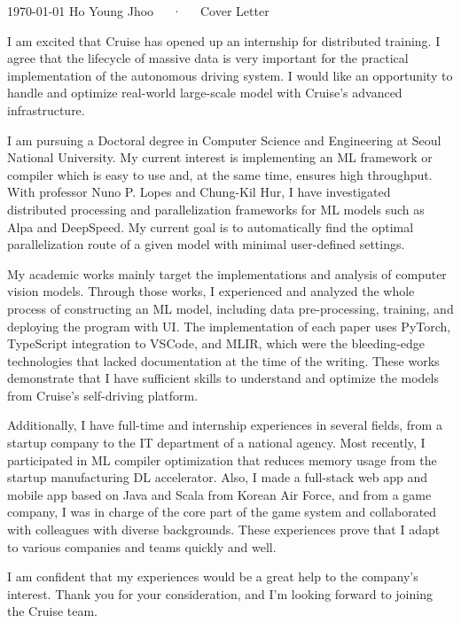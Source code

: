 \documentclass[11pt, a4paper]{awesome-cv}
\begin{document}
\makecvheader[L]

\makecvfooter
{\today}
{Ho Young Jhoo~~~·~~~Cover Letter}
{}

\makelettertitle

\begin{cvletter}

  I am excited that Cruise has opened up an internship for distributed training. I agree that the lifecycle of massive data is very important for the practical implementation of the autonomous driving system. I would like an opportunity to handle and optimize real-world large-scale model with Cruise's advanced infrastructure.

  I am pursuing a Doctoral degree in Computer Science and Engineering at Seoul National University.
  My current interest is implementing an ML framework or compiler which is easy to use and, at the same time, ensures high throughput. With professor Nuno P. Lopes and Chung-Kil Hur, I have investigated distributed processing and parallelization frameworks for ML models such as Alpa and DeepSpeed. My current goal is to automatically find the optimal parallelization route of a given model with minimal user-defined settings.

  My academic works mainly target the implementations and analysis of computer vision models. Through those works, I experienced and analyzed the whole process of constructing an ML model, including data pre-processing, training, and deploying the program with UI. The implementation of each paper uses PyTorch, TypeScript integration to VSCode, and MLIR, which were the bleeding-edge technologies that lacked documentation at the time of the writing. These works demonstrate that I have sufficient skills to understand and optimize the models from Cruise's self-driving platform.

  Additionally, I have full-time and internship experiences in several fields, from a startup company to the IT department of a national agency. Most recently, I participated in ML compiler optimization that reduces memory usage from the startup manufacturing DL accelerator. Also, I made a full-stack web app and mobile app based on Java and Scala from Korean Air Force, and from a game company, I was in charge of the core part of the game system and collaborated with colleagues with diverse backgrounds. These experiences prove that I adapt to various companies and teams quickly and well.

  I am confident that my experiences would be a great help to the company's interest. Thank you for your consideration, and I'm looking forward to joining the Cruise team.

\end{cvletter}


\makeletterclosing
\end{document}
